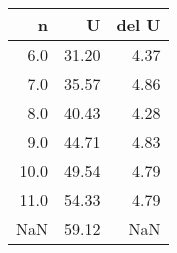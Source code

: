 \begin{tabular}{rrr}
\toprule
   n &     U &  del U \\
\midrule
 6.0 & 31.20 &   4.37 \\
 7.0 & 35.57 &   4.86 \\
 8.0 & 40.43 &   4.28 \\
 9.0 & 44.71 &   4.83 \\
10.0 & 49.54 &   4.79 \\
11.0 & 54.33 &   4.79 \\
 NaN & 59.12 &    NaN \\
\bottomrule
\end{tabular}
